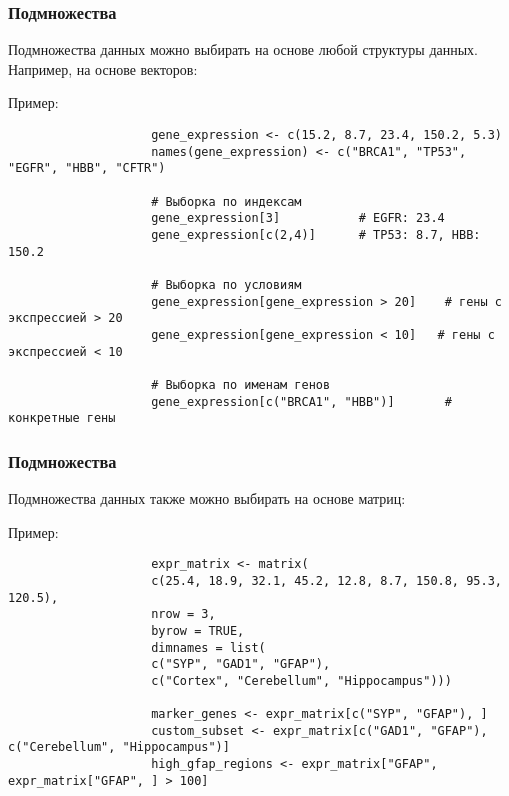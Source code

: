 \documentclass[10pt]{beamer}
\begin{document}
	\begin{frame}[fragile]
		\frametitle{Подмножества}
		Подмножества данных можно выбирать на основе любой структуры данных. Например, на основе векторов:
		{\fontsize{8}{9}\selectfont
			\begin{exampleblock}{Пример:}
				\begin{verbatim}
					gene_expression <- c(15.2, 8.7, 23.4, 150.2, 5.3)
					names(gene_expression) <- c("BRCA1", "TP53", "EGFR", "HBB", "CFTR")
					
					# Выборка по индексам
					gene_expression[3]           # EGFR: 23.4
					gene_expression[c(2,4)]      # TP53: 8.7, HBB: 150.2
					
					# Выборка по условиям
					gene_expression[gene_expression > 20]    # гены с экспрессией > 20
					gene_expression[gene_expression < 10]   # гены с экспрессией < 10
					
					# Выборка по именам генов
					gene_expression[c("BRCA1", "HBB")]       # конкретные гены\end{verbatim}
			\end{exampleblock}
		}
		
		
	\end{frame}
	
	\begin{frame}[fragile]
		\frametitle{Подмножества}
		Подмножества данных также можно выбирать на основе матриц:
		{\fontsize{8}{9}\selectfont
			\begin{exampleblock}{Пример:}
				\begin{verbatim}
					expr_matrix <- matrix(
					c(25.4, 18.9, 32.1, 45.2, 12.8, 8.7, 150.8, 95.3, 120.5), 
					nrow = 3,
					byrow = TRUE,
					dimnames = list(
					c("SYP", "GAD1", "GFAP"), 
					c("Cortex", "Cerebellum", "Hippocampus")))
					
					marker_genes <- expr_matrix[c("SYP", "GFAP"), ]
					custom_subset <- expr_matrix[c("GAD1", "GFAP"), c("Cerebellum", "Hippocampus")]
					high_gfap_regions <- expr_matrix["GFAP", expr_matrix["GFAP", ] > 100]          
					
				\end{verbatim}
			\end{exampleblock}
		}
		
		
	\end{frame}
	
\end{document}
